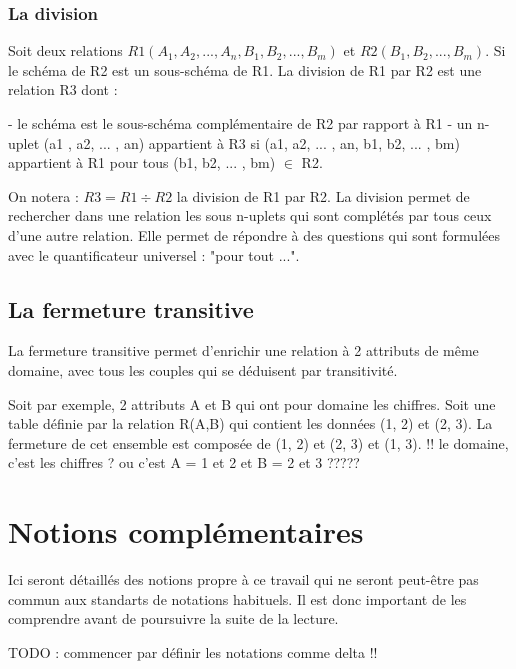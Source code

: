 \documentclass[12pt, a4paper, oneside, titlepage]{book}%
\begin{document}
\subsubsection{La division}
Soit deux relations $R1 (A_1, A_2, ... , A_n, B_1, B_2, ... , B_m)$ et $R2 (B_1, B_2, ... , B_m)$.
Si le schéma de R2 est un sous-schéma de R1. La division de R1 par R2 est une relation R3 dont :
\begin{enumarate}
-  le schéma est le sous-schéma complémentaire de R2 par rapport à R1
-  un n-uplet (a1 , a2, ... , an) appartient à R3 si (a1, a2, ... , an, b1, b2, ... , bm) appartient à R1 pour tous (b1, b2, ... , bm) $\in$ R2.
\end{enumarate}
On notera : $R3 = R1 \div  R2$ la division de R1 par R2. La division permet de rechercher dans une relation les sous n-uplets qui sont complétés par tous ceux d'une autre relation. Elle permet de répondre à des questions qui sont formulées avec le quantificateur universel : "pour tout ...".

\subsection{La fermeture transitive}
La fermeture transitive permet d'enrichir une relation à 2 attributs de même domaine, avec tous les couples qui se déduisent par transitivité.

Soit par exemple, 2 attributs A et B qui ont pour domaine les chiffres.
Soit une table définie par la relation R(A,B) qui contient les données (1, 2) et (2, 3). La fermeture de cet ensemble est composée de (1, 2) et (2, 3) et (1, 3).
!! le domaine, c'est les chiffres ? ou c'est A = 1 et 2 et B = 2 et 3 ?????

\clearpage

\section{Notions complémentaires}\label{SECcomplement}
Ici seront détaillés des notions propre à ce travail qui ne seront peut-être pas commun aux standarts de notations habituels. Il est donc important de les comprendre avant de poursuivre la suite de la lecture.

TODO :  commencer par définir les notations comme delta !!
\end{document}
